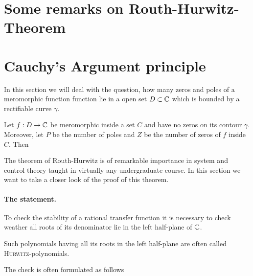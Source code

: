 \message{ !name(On The Routh-Hurwitz Theorem.tex)}\documentclass[10pt,a4paper]{article}
\begin{document}
\section{Some remarks on Routh-Hurwitz-Theorem}






\section{Cauchy's Argument principle}

In this section we will deal with the question, how many zeros and poles of a meromorphic function function lie in a open set $D \subset \mathbb{C}$ which is bounded by a rectifiable curve $\gamma$.

\begin{lemma} 
Let $f:D\rightarrow\mathbb{C}$ be meromorphic inside a set $C$ and have no zeros on its contour $\gamma$. Moreover, let $P$ be the number of poles and $Z$ be the number of zeros of $f$ inside $C$. Then
\end{lemma}

The theorem of Routh-Hurwitz is of remarkable importance in system and control theory taught in virtually any undergraduate course. In this section we want to take a closer look of the proof of this theorem.

\paragraph{The statement.}

To check the stability of a rational transfer function it is necessary to check weather all roots of its denominator lie in the left half-plane of $\mathbb{C}$.

Such polynomials having all its roots in the left half-plane are often called \textsc{Hurwitz}-polynomials.

The check is often formulated as follows
\end{document}
